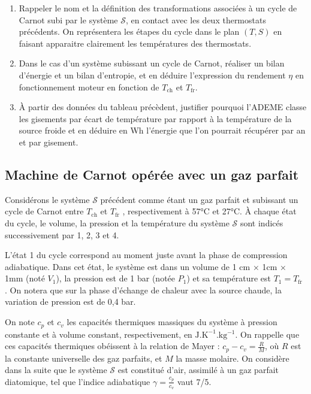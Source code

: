 \documentclass[
  10pt,
  french,
  a4paper,
  DIV=18]{scrartcl}
\begin{document}
\begin{enumerate}
\def\labelenumi{\arabic{enumi}.}
\setcounter{enumi}{1}
\item
  Rappeler le nom et la définition des transformations associées à un
  cycle de Carnot subi par le système \(\mathcal{S}\), en contact avec
  les deux thermostats précédents. On représentera les étapes du cycle
  dans le plan \((T,S)\) en faisant apparaitre clairement les
  températures des thermostats.
\item
  Dans le cas d'un système subissant un cycle de Carnot, réaliser un
  bilan d'énergie et un bilan d'entropie, et en déduire l'expression du
  rendement \(\eta\) en fonctionnement moteur en fonction de
  \(T_\mathrm{ch}\) et \(T_\mathrm{fr}\).
\item
  À partir des données du tableau précèdent, justifier pourquoi l'ADEME
  classe les gisements par écart de température par rapport à la
  température de la source froide et en déduire en Wh l'énergie que l'on
  pourrait récupérer par an et par gisement.
\end{enumerate}

\subsection*{Machine de Carnot opérée avec un gaz
parfait}\label{machine-de-carnot-opuxe9ruxe9e-avec-un-gaz-parfait}

Considérons le système \(\mathcal{S}\) précédent comme étant un gaz
parfait et subissant un cycle de Carnot entre \(T_\mathrm{ch}\) et
\(T_\mathrm{fr}\) , respectivement à 57°C et 27°C. À chaque état du
cycle, le volume, la pression et la température du système
\(\mathcal{S}\) sont indicés successivement par 1, 2, 3 et 4.

L'état 1 du cycle correspond au moment juste avant la phase de
compression adiabatique. Dans cet état, le système est dans un volume de
1 cm × 1cm × 1mm (noté \(V_1\)), la pression est de 1 bar (notée
\(P_1\)) et sa température est \(T_1 = T_\mathrm{fr}\) . On notera que
sur la phase d'échange de chaleur avec la source chaude, la variation de
pression est de 0,4 bar.

On note \(c_p\) et \(c_v\) les capacités thermiques massiques du système
à pression constante et à volume constant, respectivement, en
\(\mathrm{J.K^{-1}.kg^{-1}}\). On rappelle que ces capacités thermiques
obéissent à la relation de Mayer : \(c_p - c_v = \frac{R}{M}\), où \(R\)
est la constante universelle des gaz parfaits, et \(M\) la masse
molaire. On considère dans la suite que le système \(\mathcal{S}\) est
constitué d'air, assimilé à un gaz parfait diatomique, tel que l'indice
adiabatique \(\gamma = \frac{c_p}{c_v}\) vaut 7/5.
\end{document}

